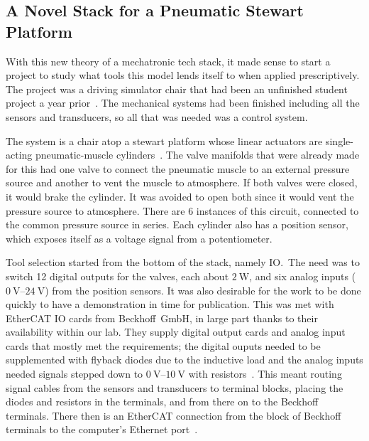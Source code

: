 \documentclass[english,12pt,a4paper,pdftex,eng,utf8]{aaltothesis}
\begin{document}
\subsection{A Novel Stack for a Pneumatic Stewart Platform}

With this new theory of a mechatronic tech stack, it made sense to start a project to study what tools this model lends itself to when applied prescriptively.  The project was a driving simulator chair that had been an unfinished student project a year prior~\cite{Bjoerklund2023}.  The mechanical systems had been finished including all the sensors and transducers, so all that was needed was a control system.

The system is a chair atop a stewart platform whose linear actuators are single-acting pneumatic-muscle cylinders~\cite{Stewart1965, Caldwell1995}.  The valve manifolds that were already made for this had one valve to connect the pneumatic muscle to an external pressure source and another to vent the muscle to atmosphere.  If both valves were closed, it would brake the cylinder.  It was avoided to open both since it would vent the pressure source to atmosphere.  There are 6 instances of this circuit, connected to the common pressure source in series.  Each cylinder also has a position sensor, which exposes itself as a voltage signal from a potentiometer.

Tool selection started from the bottom of the stack, namely IO.\  The need was to switch 12 digital outputs for the valves, each about $\qty{2}{\watt}$, and six analog inputs ($\qtyrange[range-units=single,range-phrase=..]{0}{24}{\volt}$) from the position sensors.  It was also desirable for the work to be done quickly to have a demonstration in time for publication.  This was met with EtherCAT IO cards from Beckhoff~GmbH, in large part thanks to their availability within our lab.  They supply digital output cards and analog input cards that mostly met the requirements; the digital ouputs needed to be supplemented with flyback diodes due to the inductive load and the analog inputs needed signals stepped down to $\qtyrange[range-units=single,range-phrase=..]{0}{10}{\volt}$ with resistors~\cite{BeckhoffEL2042,BeckhoffEL3062}.  This meant routing signal cables from the sensors and transducers to terminal blocks, placing the diodes and resistors in the terminals, and from there on to the Beckhoff terminals.  There then is an EtherCAT connection from the block of Beckhoff terminals to the computer's Ethernet port~\cite{BeckhoffEK1100}.
\end{document}
